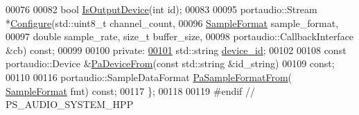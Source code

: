 \begin{DoxyCode}
00076 
00082     \textcolor{keywordtype}{bool} \hyperlink{classAudioSystem_a001cd82f854883b80b3ed7d35795581b}{IsOutputDevice}(\textcolor{keywordtype}{int} \textcolor{keywordtype}{id});
00083 
00095     portaudio::Stream *\hyperlink{classAudioSystem_a78e8754440e0a29f5fac9ca1cd79a109}{Configure}(std::uint8\_t channel\_count,
00096                                  \hyperlink{sample__formats_8hpp_a21cca244e782ff3acc8805fb73236772}{SampleFormat} sample\_format,
00097                                  \textcolor{keywordtype}{double} sample\_rate, \textcolor{keywordtype}{size\_t} buffer\_size,
00098                                  portaudio::CallbackInterface &cb) \textcolor{keyword}{const};
00099 
00100 \textcolor{keyword}{private}:
\hypertarget{audio__system_8hpp_source_l00101}{}\hyperlink{classAudioSystem_a3071e6d8643b3d0275ba63820e6e0072}{00101}     std::string \hyperlink{classAudioSystem_a3071e6d8643b3d0275ba63820e6e0072}{device\_id}; 
00102 
00108     \textcolor{keyword}{const} portaudio::Device &\hyperlink{classAudioSystem_a513a0de4748574e25cba443f28949a90}{PaDeviceFrom}(\textcolor{keyword}{const} std::string &id\_string)
00109                     \textcolor{keyword}{const};
00110 
00116     portaudio::SampleDataFormat \hyperlink{classAudioSystem_aac640b14ad80c2518539bcafe9f4b5ac}{PaSampleFormatFrom}(
      \hyperlink{sample__formats_8hpp_a21cca244e782ff3acc8805fb73236772}{SampleFormat} fmt) \textcolor{keyword}{const};
00117 \};
00118 
00119 \textcolor{preprocessor}{#endif // PS\_AUDIO\_SYSTEM\_HPP}
\end{DoxyCode}
